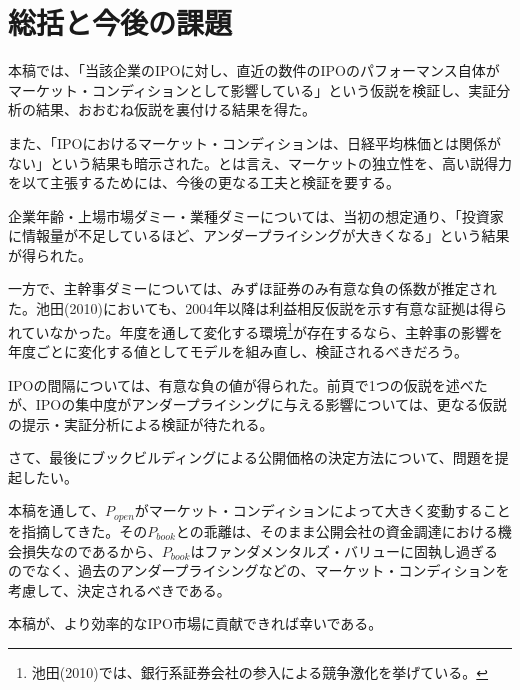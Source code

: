 \documentclass{jsarticle}
\begin{document}
\section{総括と今後の課題}
本稿では、「当該企業のIPOに対し、直近の数件のIPOのパフォーマンス自体がマーケット・コンディションとして影響している」という仮説を検証し、実証分析の結果、おおむね仮説を裏付ける結果を得た。\par
また、「IPOにおけるマーケット・コンディションは、日経平均株価とは関係がない」という結果も暗示された。とは言え、マーケットの独立性を、高い説得力を以て主張するためには、今後の更なる工夫と検証を要する。\par
企業年齢・上場市場ダミー・業種ダミーについては、当初の想定通り、「投資家に情報量が不足しているほど、アンダープライシングが大きくなる」という結果が得られた。\par
一方で、主幹事ダミーについては、みずほ証券のみ有意な負の係数が推定された。池田(2010)\cite{ikeda2}においても、2004年以降は利益相反仮説を示す有意な証拠は得られていなかった。年度を通して変化する環境\footnote[21]{池田(2010)\cite{ikeda2}では、銀行系証券会社の参入による競争激化を挙げている。}が存在するなら、主幹事の影響を年度ごとに変化する値としてモデルを組み直し、検証されるべきだろう。\par
IPOの間隔については、有意な負の値が得られた。前頁で1つの仮説を述べたが、IPOの集中度がアンダープライシングに与える影響については、更なる仮説の提示・実証分析による検証が待たれる。\\ \par

さて、最後にブックビルディングによる公開価格の決定方法について、問題を提起したい。\par
本稿を通して、$P_{open}$がマーケット・コンディションによって大きく変動することを指摘してきた。その$P_{book}$との乖離は、そのまま公開会社の資金調達における機会損失なのであるから、$P_{book}$はファンダメンタルズ・バリューに固執し過ぎるのでなく、過去のアンダープライシングなどの、マーケット・コンディションを考慮して、決定されるべきである。\\ \par
本稿が、より効率的なIPO市場に貢献できれば幸いである。


\newpage
\end{document}
